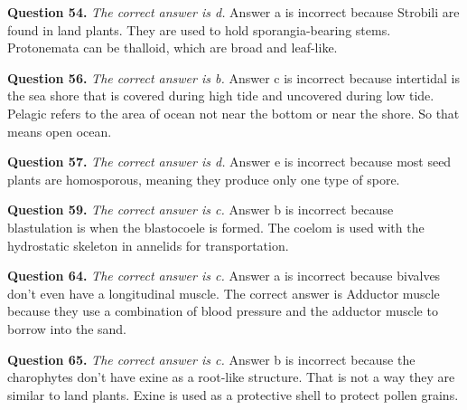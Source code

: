 \documentclass{article}
\begin{document}
\textbf{Question 54.} \textit{The correct answer is d.} Answer a is incorrect
because Strobili are found in land plants. They are used to hold
sporangia-bearing stems. Protonemata can be thalloid, which are broad and
leaf-like.

\textbf{Question 56.} \textit{The correct answer is b.} Answer c is incorrect
because intertidal is the sea shore that is covered during high tide and
uncovered during low tide. Pelagic refers to the area of ocean not near the
bottom or near the shore. So that means open ocean.

\textbf{Question 57.} \textit{The correct answer is d.} Answer e is incorrect
because most seed plants are homosporous, meaning they produce only one type of
spore.

\textbf{Question 59.} \textit{The correct answer is c.} Answer b is incorrect
because blastulation is when the blastocoele is formed. The coelom is used with
the hydrostatic skeleton in annelids for transportation.

\textbf{Question 64.} \textit{The correct answer is c.} Answer a is incorrect
because bivalves don't even have a longitudinal muscle. The correct answer is
Adductor muscle because they use a combination of blood pressure and the
adductor muscle to borrow into the sand.

\textbf{Question 65.} \textit{The correct answer is c.} Answer b is incorrect
because the charophytes don't have exine as a root-like structure. That is not a
way they are similar to land plants. Exine is used as a protective shell to
protect pollen grains.
\end{document}
